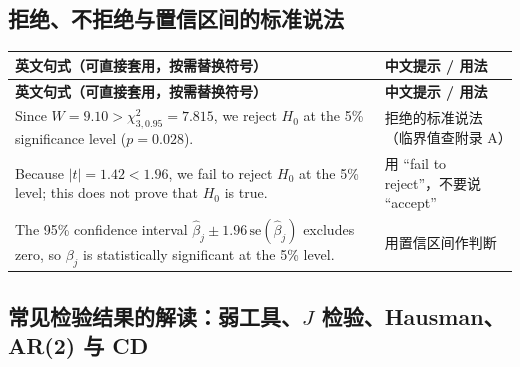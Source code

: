 \subsection{拒绝、不拒绝与置信区间的标准说法}

{\renewcommand{\arraystretch}{1.15}\begin{longtable}{@{}>{\raggedright\arraybackslash}p{11.4cm}>{\raggedright\arraybackslash\small}p{4.3cm}@{}}
\toprule
\textbf{英文句式（可直接套用，按需替换符号）} & \textbf{中文提示 / 用法}\\
\midrule
\endfirsthead
\toprule
\textbf{英文句式（可直接套用，按需替换符号）} & \textbf{中文提示 / 用法}\\
\midrule
\endhead
\bottomrule
\endlastfoot
Since $W=9.10>\chi^2_{3,0.95}=7.815$, we reject $H_0$ at the 5\% significance level ($p=0.028$). & 拒绝的标准说法（临界值查附录 A）\\
\addlinespace[2pt]
Because $|t|=1.42<1.96$, we fail to reject $H_0$ at the 5\% level; this does not prove that $H_0$ is true. & 用 “fail to reject”，不要说 “accept”\\
\addlinespace[2pt]
The 95\% confidence interval $\hat\beta_j\pm 1.96\,\mathrm{se}(\hat\beta_j)$ excludes zero, so $\beta_j$ is statistically significant at the 5\% level. & 用置信区间作判断\\
\end{longtable}}


\subsection{常见检验结果的解读：弱工具、\texorpdfstring{$J$}{J} 检验、Hausman、AR(2) 与 CD}

